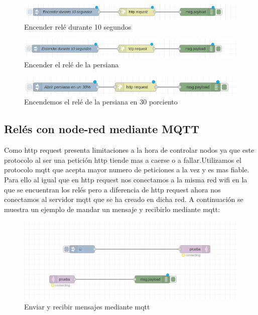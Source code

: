 \documentclass[11pt, letterpaper]{article}
\begin{document}
\begin{figure}[h]
	\centering
	\includegraphics[width=\textwidth]{encender_10_sec.png}
	\caption{Encender relé durante 10 segundos} 
	\label{fig:encender_10_sec}
\end{figure}

\begin{figure}[h]
	\centering
	\includegraphics[width=\textwidth]{abrir_persiana.png}
	\caption{Encender el relé de la persiana} 
	\label{fig:abrir_persiana}
\end{figure}

\begin{figure}[h]
	\centering
	\includegraphics[width=\textwidth]{abrir_persiana_30_porciento.png}
	\caption{Encendemos el relé de la persiana en 30 porciento}
	\label{fig:abrir_30_porciento}
\end{figure}

\subsection{Relés con node-red mediante MQTT}
Como http request presenta limitaciones a la hora de controlar nodos ya que este protocolo al ser una petición http tiende mas 
a caerse o a fallar.Utilizamos el protocolo mqtt que acepta mayor numero de peticiones a la vez y es mas fiable. Para ello al igual que en http request nos
conectamos a la misma red wifi en la que se encuentran los relés pero a diferencia de http request ahora nos conectamos al servidor mqtt que se ha creado en dicha red.
A continuación se muestra un ejemplo de mandar un mensaje y recibirlo mediante mqtt:
\begin{figure}[h]
    \centering
    \includegraphics[width=\textwidth]{mqtt_enviar_recibir.png}
    \caption{Enviar y recibir mensajes mediante mqtt} 
    \label{fig:mqtt_enviar_recibir}
\end{figure}
\end{document}
